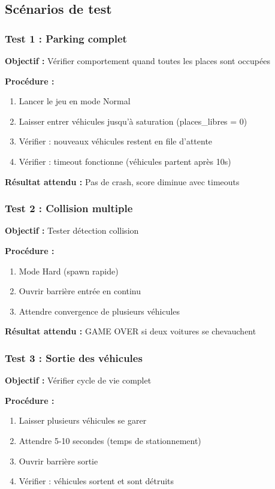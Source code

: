 \documentclass[12pt,a4paper]{article}
\begin{document}
\subsection{Scénarios de test}

\subsubsection{Test 1 : Parking complet}

\textbf{Objectif :} Vérifier comportement quand toutes les places sont occupées

\textbf{Procédure :}
\begin{enumerate}
    \item Lancer le jeu en mode Normal
    \item Laisser entrer véhicules jusqu'à saturation (places\_libres = 0)
    \item Vérifier : nouveaux véhicules restent en file d'attente
    \item Vérifier : timeout fonctionne (véhicules partent après 10s)
\end{enumerate}

\textbf{Résultat attendu :} Pas de crash, score diminue avec timeouts

\subsubsection{Test 2 : Collision multiple}

\textbf{Objectif :} Tester détection collision

\textbf{Procédure :}
\begin{enumerate}
    \item Mode Hard (spawn rapide)
    \item Ouvrir barrière entrée en continu
    \item Attendre convergence de plusieurs véhicules
\end{enumerate}

\textbf{Résultat attendu :} GAME OVER si deux voitures se chevauchent

\subsubsection{Test 3 : Sortie des véhicules}

\textbf{Objectif :} Vérifier cycle de vie complet

\textbf{Procédure :}
\begin{enumerate}
    \item Laisser plusieurs véhicules se garer
    \item Attendre 5-10 secondes (temps de stationnement)
    \item Ouvrir barrière sortie
    \item Vérifier : véhicules sortent et sont détruits
\end{enumerate}
\end{document}
